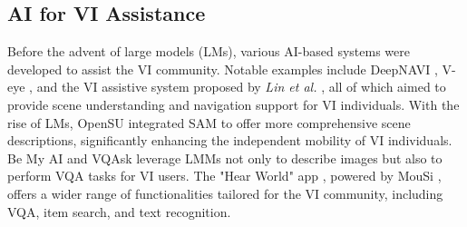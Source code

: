 \subsection{AI for VI Assistance}
Before the advent of large models (LMs), various AI-based systems were developed to assist the VI community. Notable examples include DeepNAVI \cite{3}, V-eye \cite{4}, and the VI assistive system proposed by \textit{Lin et al.} \cite{5}, all of which aimed to provide scene understanding and navigation support for VI individuals. With the rise of LMs, OpenSU \cite{22} integrated SAM \cite{23} to offer more comprehensive scene descriptions, significantly enhancing the independent mobility of VI individuals. Be My AI \cite{14} and VQAsk \cite{16} leverage LMMs not only to describe images but also to perform VQA tasks for VI users. The "Hear World" app , powered by MouSi \cite{17}, offers a wider range of functionalities tailored for the VI community, including VQA, item search, and text recognition.